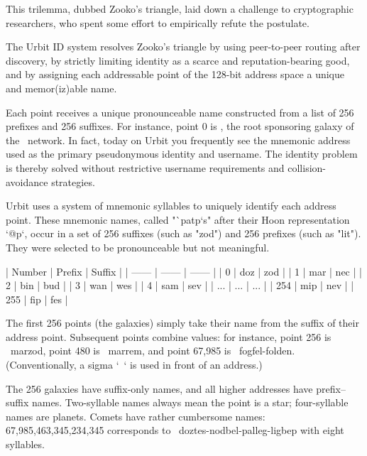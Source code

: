 {{{This trilemma, dubbed Zooko's triangle, laid down a challenge to cryptographic researchers, who spent some effort to empirically refute the postulate.

The Urbit ID system resolves Zooko's triangle by using peer-to-peer routing after discovery, by strictly limiting identity as a scarce and reputation-bearing good, and by assigning each addressable point of the 128-bit address space a unique and memor(iz)able name.

Each point receives a unique pronounceable name constructed from a list of 256 prefixes and 256 suffixes.  For instance, point $0$ is \zod, the root sponsoring galaxy of the \ames~network.  In fact, today on Urbit you frequently see the mnemonic address used as the primary pseudonymous identity and username.  The identity problem is thereby solved without restrictive username requirements and collision-avoidance strategies.

Urbit uses a system of mnemonic syllables to uniquely identify each address point.  These mnemonic names, called "`patp`s" after their Hoon representation `@p`, occur in a set of 256 suffixes (such as "zod") and 256 prefixes (such as "lit").  They were selected to be pronounceable but not meaningful.

| Number | Prefix | Suffix |
| ------ | ------ | ------ |
|      0 |    doz |    zod |
|      1 |    mar |    nec |
|      2 |    bin |    bud |
|      3 |    wan |    wes |
|      4 |    sam |    sev |
|    ... |    ... |    ... |
|    254 |    mip |    nev |
|    255 |    fip |    fes |

The first 256 points (the galaxies) simply take their name from the suffix of their address point.  Subsequent points combine values:  for instance, point 256 is ~marzod, point 480 is ~marrem, and point 67,985 is ~fogfel-folden.  (Conventionally, a sigma `~` is used in front of an address.)


The 256 galaxies have suffix-only names, and all higher addresses have prefix–suffix names.  Two-syllable names always mean the point is a star; four-syllable names are planets.  Comets have rather cumbersome names:  67,985,463,345,234,345 corresponds to ~doztes-nodbel-palleg-ligbep with eight syllables.

}}}
